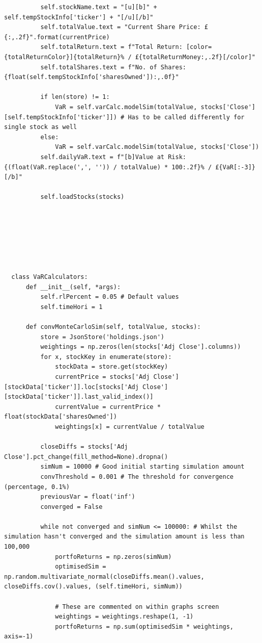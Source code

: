 \documentclass{article}
\begin{document}
\begin{verbatim}
          self.stockName.text = "[u][b]" + self.tempStockInfo['ticker'] + "[/u][/b]"
          self.totalValue.text = "Current Share Price: £{:,.2f}".format(currentPrice)
          self.totalReturn.text = f"Total Return: [color={totalReturnColor}]{totalReturn}% / £{totalReturnMoney:,.2f}[/color]"
          self.totalShares.text = f"No. of Shares: {float(self.tempStockInfo['sharesOwned']):,.0f}"

          if len(store) != 1:            
              VaR = self.varCalc.modelSim(totalValue, stocks['Close'][self.tempStockInfo['ticker']]) # Has to be called differently for single stock as well
          else:
              VaR = self.varCalc.modelSim(totalValue, stocks['Close'])
          self.dailyVaR.text = f"[b]Value at Risk: {(float(VaR.replace(',', '')) / totalValue) * 100:.2f}% / £{VaR[:-3]}[/b]"

          self.loadStocks(stocks)







  class VaRCalculators:
      def __init__(self, *args):
          self.rlPercent = 0.05 # Default values
          self.timeHori = 1
      
      def convMonteCarloSim(self, totalValue, stocks):
          store = JsonStore('holdings.json')
          weightings = np.zeros(len(stocks['Adj Close'].columns))
          for x, stockKey in enumerate(store):
              stockData = store.get(stockKey)
              currentPrice = stocks['Adj Close'][stockData['ticker']].loc[stocks['Adj Close'][stockData['ticker']].last_valid_index()]
              currentValue = currentPrice * float(stockData['sharesOwned'])
              weightings[x] = currentValue / totalValue

          closeDiffs = stocks['Adj Close'].pct_change(fill_method=None).dropna()
          simNum = 10000 # Good initial starting simulation amount
          convThreshold = 0.001 # The threshold for convergence (percentage, 0.1%)
          previousVar = float('inf')
          converged = False

          while not converged and simNum <= 100000: # Whilst the simulation hasn't converged and the simulation amount is less than 100,000
              portfoReturns = np.zeros(simNum)
              optimisedSim = np.random.multivariate_normal(closeDiffs.mean().values, closeDiffs.cov().values, (self.timeHori, simNum))

              # These are commented on within graphs screen
              weightings = weightings.reshape(1, -1)
              portfoReturns = np.sum(optimisedSim * weightings, axis=-1)


\end{verbatim}
\end{document}
